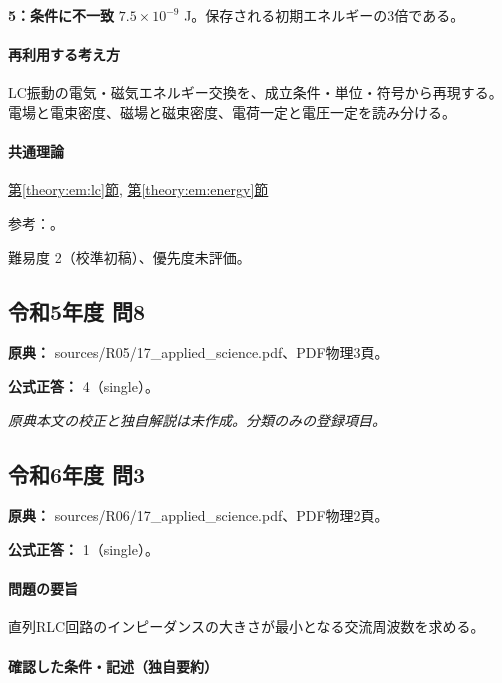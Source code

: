 \noindent\textbf{5：条件に不一致} \(7.5\times10^{-9}\) J。保存される初期エネルギーの3倍である。\par

\paragraph{再利用する考え方} LC振動の電気・磁気エネルギー交換を、成立条件・単位・符号から再現する。電場と電束密度、磁場と磁束密度、電荷一定と電圧一定を読み分ける。

\paragraph{共通理論} \hyperref[theory:em:lc]{第\ref*{theory:em:lc}節}, \hyperref[theory:em:energy]{第\ref*{theory:em:energy}節}

\par 参考：\cite{mit_em11}。

\par 難易度 2（校準初稿）、優先度未評価。

\subsection{令和5年度 問8}
\label{q:r05-reg-applied-08}

\noindent\textbf{原典：} sources/R05/17\_applied\_science.pdf、PDF物理3頁。

\textbf{公式正答：} 4（single）。

\par\textit{原典本文の校正と独自解説は未作成。分類のみの登録項目。}

\subsection{令和6年度 問3}
\label{q:r06-reg-applied-03}

\noindent\textbf{原典：} sources/R06/17\_applied\_science.pdf、PDF物理2頁。

\textbf{公式正答：} 1（single）。

\paragraph{問題の要旨} 直列RLC回路のインピーダンスの大きさが最小となる交流周波数を求める。

\paragraph{確認した条件・記述（独自要約）}\mbox{}\par

